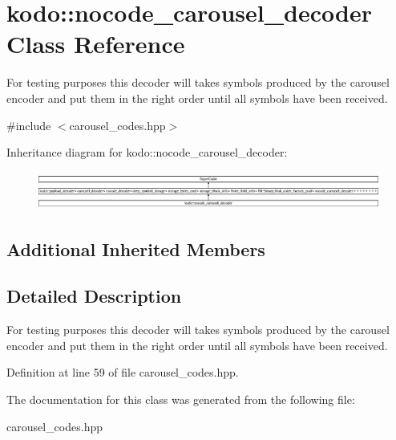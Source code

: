 \hypertarget{classkodo_1_1nocode__carousel__decoder}{\section{kodo\-:\-:nocode\-\_\-carousel\-\_\-decoder Class Reference}
\label{classkodo_1_1nocode__carousel__decoder}
}


For testing purposes this decoder will takes symbols produced by the carousel encoder and put them in the right order until all symbols have been received.  




{\ttfamily \#include $<$carousel\-\_\-codes.\-hpp$>$}

Inheritance diagram for kodo\-:\-:nocode\-\_\-carousel\-\_\-decoder\-:\begin{figure}[H]
\begin{center}
\leavevmode
\includegraphics[height=1.266968cm]{classkodo_1_1nocode__carousel__decoder}
\end{center}
\end{figure}
\subsection*{Additional Inherited Members}


\subsection{Detailed Description}
For testing purposes this decoder will takes symbols produced by the carousel encoder and put them in the right order until all symbols have been received. 

Definition at line 59 of file carousel\-\_\-codes.\-hpp.



The documentation for this class was generated from the following file\-:\begin{DoxyCompactItemize}
\item 
carousel\-\_\-codes.\-hpp\end{DoxyCompactItemize}
